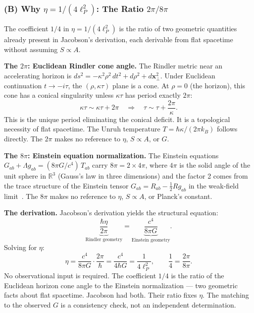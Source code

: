\documentclass[12pt,a4paper]{article}
\begin{document}
\subsubsection*{(B) Why $\eta = 1/(4\ell_P^2)$: The Ratio $2\pi/8\pi$}

The coefficient $1/4$ in $\eta = 1/(4\ell_P^2)$ is the ratio of two
geometric quantities already present in Jacobson's derivation, each derivable
from flat spacetime without assuming $S \propto A$.

\textbf{The $2\pi$: Euclidean Rindler cone angle.}
The Rindler metric near an accelerating horizon is $ds^2 = -\kappa^2\rho^2\,dt^2
+ d\rho^2 + d\mathbf{x}_\perp^2$. Under Euclidean continuation $t \to -i\tau$,
the $(\rho, \kappa\tau)$ plane is a cone. At $\rho = 0$ (the horizon), this
cone has a conical singularity unless $\kappa\tau$ has period exactly $2\pi$:
\begin{equation}
\kappa\tau \sim \kappa\tau + 2\pi
\quad\Longrightarrow\quad
\tau \sim \tau + \frac{2\pi}{\kappa}.
\label{eq:period_ao}
\end{equation}
This is the unique period eliminating the conical deficit. It is a topological
necessity of flat spacetime. The Unruh temperature $T = \hbar\kappa/(2\pi k_B)$
follows directly. The $2\pi$ makes no reference to $\eta$, $S \propto A$, or $G$.

\textbf{The $8\pi$: Einstein equation normalization.}
The Einstein equations $G_{ab} + \Lambda g_{ab} = (8\pi G/c^4)\,T_{ab}$
carry $8\pi = 2 \times 4\pi$, where $4\pi$ is the solid angle of the unit
sphere in $\mathbb{R}^3$ (Gauss's law in three dimensions) and the factor 2
comes from the trace structure of the Einstein tensor $G_{ab} = R_{ab} -
\frac{1}{2}Rg_{ab}$ in the weak-field limit~\citep{Wald1984}. The $8\pi$
makes no reference to $\eta$, $S \propto A$, or Planck's constant.

\textbf{The derivation.}
Jacobson's derivation yields the structural equation:
\begin{equation}
\underbrace{\frac{\hbar\eta}{2\pi}}_{\text{Rindler geometry}}
= \underbrace{\frac{c^4}{8\pi G}}_{\text{Einstein geometry}}.
\label{eq:jacobson_structure_ao}
\end{equation}
Solving for $\eta$:
\begin{equation}
\boxed{\eta = \frac{c^4}{8\pi G} \cdot \frac{2\pi}{\hbar}
= \frac{c^4}{4\hbar G} = \frac{1}{4\ell_P^2},
\qquad \frac{1}{4} = \frac{2\pi}{8\pi}.}
\label{eq:eta_ao}
\end{equation}
No observational input is required. The coefficient $1/4$ is the ratio of the
Euclidean horizon cone angle to the Einstein normalization --- two geometric
facts about flat spacetime. Jacobson had both. Their ratio fixes $\eta$. The
matching to the observed $G$ is a consistency check, not an independent
determination.
\end{document}
